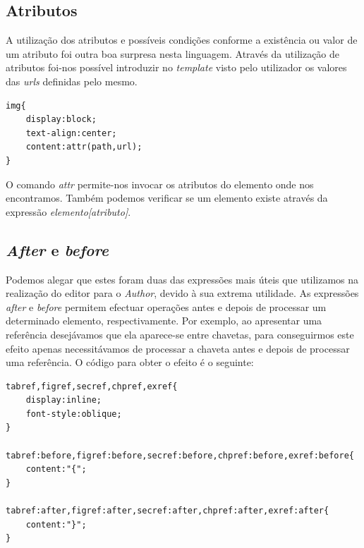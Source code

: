 \documentclass[a4paper]{article}
\begin{document}
\subsection{Atributos}

\hspace{1cm}A utilização dos atributos e possíveis condições conforme a existência ou valor de um atributo foi outra boa surpresa nesta linguagem. Através da utilização de atributos foi-nos possível introduzir no \emph{template} visto pelo utilizador os valores das \emph{urls} definidas pelo mesmo.\\

\begin{small}
\begin{lstlisting}
img{
    display:block;
    text-align:center;
    content:attr(path,url);
}
\end{lstlisting}
\end{small}

\hspace{1cm}O comando \emph{attr} permite-nos invocar os atributos do elemento onde nos encontramos. Também podemos verificar se um elemento existe através da expressão \emph{elemento[atributo]}.\\

\subsection{\emph{After} e \emph{before}}

\hspace{1cm}Podemos alegar que estes foram duas das expressões mais úteis que utilizamos na realização do editor para o \emph{Author}, devido à sua extrema utilidade. As expressões \emph{after} e \emph{before} permitem efectuar operações antes e depois de processar um determinado elemento, respectivamente. Por exemplo, ao apresentar uma referência desejávamos que ela aparece-se entre chavetas, para conseguirmos este efeito apenas necessitávamos de processar a chaveta antes e depois de
processar uma referência. O código para obter o efeito é o seguinte:\\
       
\begin{small}
\begin{lstlisting} 
tabref,figref,secref,chpref,exref{
    display:inline;
    font-style:oblique;
}

tabref:before,figref:before,secref:before,chpref:before,exref:before{
    content:"{";
}

tabref:after,figref:after,secref:after,chpref:after,exref:after{
    content:"}";
}
\end{lstlisting}
\end{small}
\end{document}
